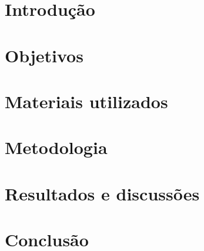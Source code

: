 \documentclass[a4paper, 14pt]{article}
\begin{document}

\thispagestyle{empty}
\begin{abstract}

\blindtext %

\end{abstract}
\pagebreak



\tableofcontents
\thispagestyle{empty}
\pagebreak



\section{Introdução}
\blindtext %


\pagebreak
\section{Objetivos}
\blindtext %

\pagebreak
\section{Materiais utilizados}
\blindtext %

\pagebreak

\section{Metodologia}
\blindtext %

\pagebreak

\section{Resultados e discussões}
\blindtext %

\pagebreak

\section{Conclusão}
\blindtext %

\pagebreak


\newpage



\pagebreak

\end{document}
